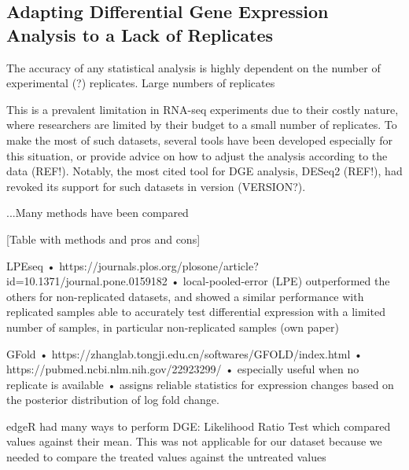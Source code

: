 \subsection{Adapting Differential Gene Expression Analysis to a Lack of Replicates}
The accuracy of any statistical analysis is highly dependent on the number of experimental (?) replicates. Large numbers of replicates

This is a prevalent limitation in RNA-seq experiments due to their costly nature, where researchers are limited by their budget to a small number of replicates. To make the most of such datasets, several tools have been developed especially for this situation, or provide advice on how to adjust the analysis according to the data (REF!). Notably, the most cited tool for \ac{DGE} analysis, DESeq2 (REF!), had revoked its support for such datasets in version (VERSION?).

...Many methods have been compared

[Table with methods and pros and cons]


LPEseq
•	https://journals.plos.org/plosone/article?id=10.1371/journal.pone.0159182
•	local-pooled-error (LPE)
 outperformed the others for non-replicated datasets, and showed a similar performance with replicated samples
able to accurately test differential expression with a limited number of samples, in particular non-replicated samples (own paper)


GFold
•	https://zhanglab.tongji.edu.cn/softwares/GFOLD/index.html
•	https://pubmed.ncbi.nlm.nih.gov/22923299/
•	especially useful when no replicate is available
•	assigns reliable statistics for expression changes based on the posterior distribution of log fold change.

edgeR had many ways to perform DGE:
Likelihood Ratio Test which compared values against their mean. This was not applicable for our dataset because we needed to compare the treated values against the untreated values


% 
